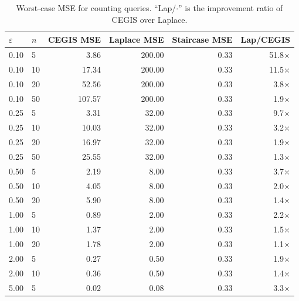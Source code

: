 \documentclass[11pt,a4paper]{article}
\begin{document}
\begin{table}[h]
\centering
\caption{Worst-case MSE for counting queries.  ``Lap/$\cdot$'' is the
  improvement ratio of CEGIS over Laplace.}
\label{tab:counting}
\begin{tabular}{@{}llrrrr@{}}
\toprule
$\varepsilon$ & $n$ & CEGIS MSE & Laplace MSE & Staircase MSE & Lap/CEGIS \\
\midrule
0.10 &  5  &   3.86  & 200.00 & 0.33 & 51.8$\times$ \\
0.10 & 10  &  17.34  & 200.00 & 0.33 & 11.5$\times$ \\
0.10 & 20  &  52.56  & 200.00 & 0.33 &  3.8$\times$ \\
0.10 & 50  & 107.57  & 200.00 & 0.33 &  1.9$\times$ \\
\midrule
0.25 &  5  &   3.31  &  32.00 & 0.33 &  9.7$\times$ \\
0.25 & 10  &  10.03  &  32.00 & 0.33 &  3.2$\times$ \\
0.25 & 20  &  16.97  &  32.00 & 0.33 &  1.9$\times$ \\
0.25 & 50  &  25.55  &  32.00 & 0.33 &  1.3$\times$ \\
\midrule
0.50 &  5  &   2.19  &   8.00 & 0.33 &  3.7$\times$ \\
0.50 & 10  &   4.05  &   8.00 & 0.33 &  2.0$\times$ \\
0.50 & 20  &   5.90  &   8.00 & 0.33 &  1.4$\times$ \\
\midrule
1.00 &  5  &   0.89  &   2.00 & 0.33 &  2.2$\times$ \\
1.00 & 10  &   1.37  &   2.00 & 0.33 &  1.5$\times$ \\
1.00 & 20  &   1.78  &   2.00 & 0.33 &  1.1$\times$ \\
\midrule
2.00 &  5  &   0.27  &   0.50 & 0.33 &  1.9$\times$ \\
2.00 & 10  &   0.36  &   0.50 & 0.33 &  1.4$\times$ \\
5.00 &  5  &   0.02  &   0.08 & 0.33 &  3.3$\times$ \\
\bottomrule
\end{tabular}
\end{table}
\end{document}
